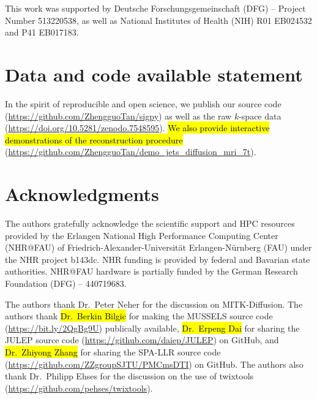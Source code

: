 \documentclass[preprint,12pt,authoryear,review]{elsarticle}
\begin{document}
    This work was supported by Deutsche Forschungsgemeinschaft (DFG) -- Project Number 513220538,
    as well as National Institutes of Health (NIH) R01 EB024532 and P41 EB017183.

    \section*{Data and code available statement}

    In the spirit of reproducible and open science,
    we publish our source code
    (\url{https://github.com/ZhengguoTan/sigpy})
    as well as the raw $k$-space data
    (\url{https://doi.org/10.5281/zenodo.7548595}).
    \hl{We also provide interactive demonstrations of the reconstruction procedure}
    (\url{https://github.com/ZhengguoTan/demo_jets_diffusion_mri_7t}).

    \section*{Acknowledgments}
        The authors gratefully acknowledge the scientific support and HPC resources
        provided by the Erlangen National High Performance Computing Center (NHR@FAU)
        of Friedrich-Alexander-Universit\"at Erlangen-N\"urnberg (FAU)
        under the NHR project b143dc.
        NHR funding is provided by federal and Bavarian state authorities.
        NHR@FAU hardware is partially funded by the German Research Foundation (DFG) -- 440719683.

        The authors thank Dr.~Peter Neher for the discussion on MITK-Diffusion.
        The authors thank
        \hl{Dr.~Berkin Bilgic} for making the MUSSELS source code
        (\url{https://bit.ly/2QgBg9U}) publically available,
        \hl{Dr.~Erpeng Dai} for sharing the JULEP source code
        (\url{https://github.com/daiep/JULEP}) on GitHub,
        and \hl{Dr.~Zhiyong Zhang} for sharing the SPA-LLR source code
        (\url{https://github.com/ZZgroupSJTU/PMCmsDTI}) on GitHub.
        The authors also thank Dr.~Philipp Ehses for the discussion on
        the use of twixtools (\url{https://github.com/pehses/twixtools}).




    
\end{document}
